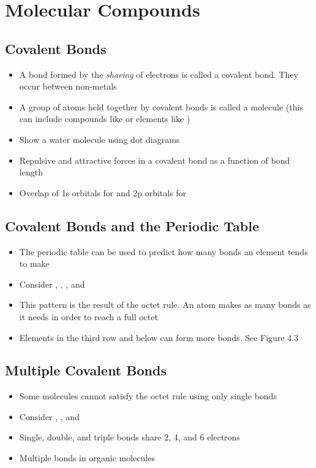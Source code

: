 \documentclass[12pt, openany, letterpaper]{memoir}
\begin{document}
\chapter{Molecular Compounds}
\section{Covalent Bonds}
\begin{itemize}
	\item A bond formed by the \emph{sharing} of electrons is called a covalent bond. They occur between non-metals
	\item A group of atoms held together by covalent bonds is called a molecule (this can include compounds like  or elements like )
	\item Show a water molecule using dot diagrams
	\item Repulsive and attractive forces in a covalent bond as a function of bond length
	\item Overlap of 1s orbitals for  and 2p orbitals for 
\end{itemize}

\section{Covalent Bonds and the Periodic Table}
\begin{itemize}
	\item The periodic table can be used to predict how many bonds an element tends to make
	\item Consider , , , and 
	\item This pattern is the result of the octet rule. An atom makes as many bonds as it needs in order to reach a full octet
	\item Elements in the third row and below can form more bonds. See Figure 4.3
\end{itemize}

\section{Multiple Covalent Bonds}
\begin{itemize}
	\item Some molecules cannot satisfy the octet rule using only single bonds
	\item Consider , , and 
	\item Single, double, and triple bonds share 2, 4, and 6 electrons
	\item Multiple bonds in organic molecules
\end{itemize}
\end{document}
